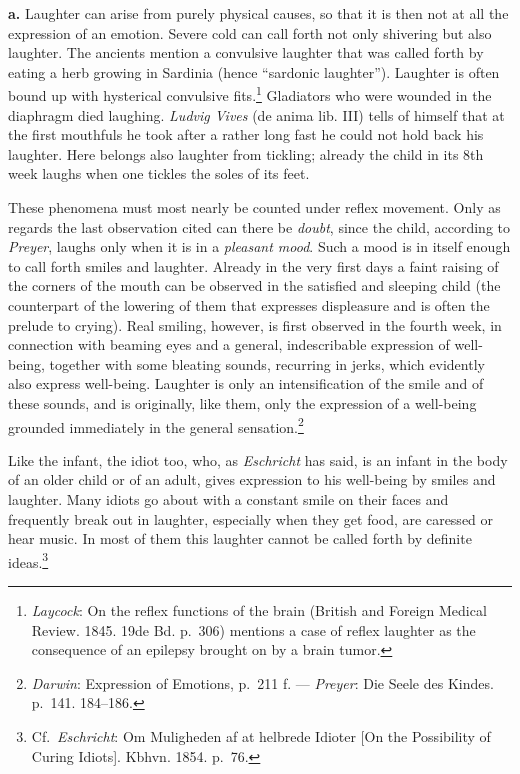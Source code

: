 \documentclass[12pt,a4paper]{book}
\newcommand{\opage}[1]{\marginnote{\footnotesize\textit{[#1]}}}
\begin{document}
\textbf{a.} Laughter can arise from purely physical causes, so that it
is then not at all the expression of an emotion. Severe cold can call
forth not only shivering but also laughter. The ancients mention a
convulsive laughter that was called forth by eating a herb growing in
Sardinia (hence ``sardonic laughter''). Laughter is often bound up with
hysterical convulsive fits.\footnote{\emph{Laycock}: On the reflex
functions of the brain (British and Foreign Medical Review. 1845. 19de
Bd. p.~306) mentions a case of reflex laughter as the consequence of an
epilepsy brought on by a brain tumor.} Gladiators who were wounded in
the
\opage{344}diaphragm died laughing. \emph{Ludvig Vives} (de anima lib.
III) tells of himself that at the first mouthfuls he took after a
rather long fast he could not hold back his laughter. Here belongs also
laughter from tickling; already the child in its 8th week laughs when
one tickles the soles of its feet.

These phenomena must most nearly be counted under reflex movement. Only
as regards the last observation cited can there be \emph{doubt}, since
the child, according to \emph{Preyer}, laughs only when it is in a
\emph{pleasant mood}. Such a mood is in itself enough to call forth
smiles and laughter. Already in the very first days a faint raising of
the corners of the mouth can be observed in the satisfied and sleeping
child (the counterpart of the lowering of them that expresses
displeasure and is often the prelude to crying). Real smiling, however,
is first observed in the fourth week, in connection with beaming eyes
and a general, indescribable expression of well-being, together with
some bleating sounds, recurring in jerks, which evidently also express
well-being. Laughter is only an intensification of the smile and of
these sounds, and is originally, like them, only the expression of a
well-being grounded immediately in the general
sensation.\footnote{\emph{Darwin}: Expression of Emotions, p.~211 f.
--- \emph{Preyer}: Die Seele des Kindes. p.~141. 184--186.}

Like the infant, the idiot too, who, as \emph{Eschricht} has said, is
an infant in the body of an older child or of an adult, gives
expression to his well-being by smiles and laughter. Many idiots go
about with a constant smile on their faces and frequently break out in
laughter, especially when they get food, are caressed or hear music. In
most of them this laughter cannot be called forth by definite
ideas.\footnote{Cf.\ \emph{Eschricht}: Om Muligheden af at helbrede
Idioter [On the Possibility of Curing Idiots]. Kbhvn. 1854. p.~76.}
\end{document}
